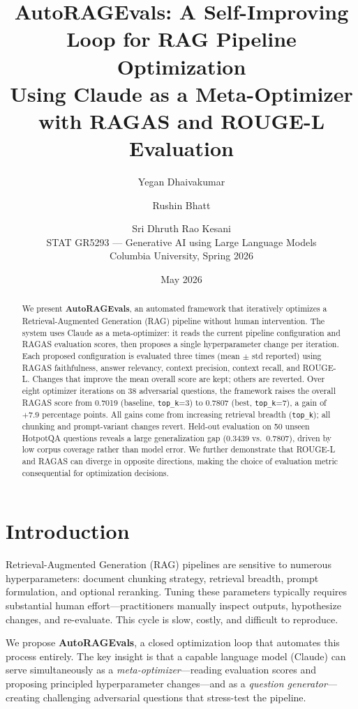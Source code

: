 \documentclass[11pt,a4paper]{article}
\title{%
  \textbf{AutoRAGEvals: A Self-Improving Loop for RAG Pipeline Optimization}\\[0.5em]
  \large Using Claude as a Meta-Optimizer with RAGAS and ROUGE-L Evaluation
}
\author{%
  Yegan Dhaivakumar \and Rushin Bhatt \and Sri Dhruth Rao Kesani\\[0.4em]
  \small STAT GR5293 --- Generative AI using Large Language Models\\
  \small Columbia University, Spring 2026
}
\date{May 2026}
\begin{document}
\maketitle

\begin{abstract}
We present \textbf{AutoRAGEvals}, an automated framework that iteratively
optimizes a Retrieval-Augmented Generation (RAG) pipeline without human
intervention. The system uses Claude as a meta-optimizer: it reads the current
pipeline configuration and RAGAS evaluation scores, then proposes a single
hyperparameter change per iteration. Each proposed configuration is evaluated
three times (mean $\pm$ std reported) using RAGAS faithfulness, answer
relevancy, context precision, context recall, and ROUGE-L. Changes that improve
the mean overall score are kept; others are reverted. Over eight optimizer
iterations on 38 adversarial questions, the framework raises the overall RAGAS
score from 0.7019 (baseline, \texttt{top\_k}=3) to 0.7807 (best, \texttt{top\_k}=7),
a gain of $+7.9$ percentage points. All gains come from increasing retrieval
breadth (\texttt{top\_k}); all chunking and prompt-variant changes revert.
Held-out evaluation on 50 unseen HotpotQA questions reveals a large
generalization gap (0.3439 vs.\ 0.7807), driven by low corpus coverage rather
than model error. We further demonstrate that ROUGE-L and RAGAS can diverge in
opposite directions, making the choice of evaluation metric consequential for
optimization decisions.
\end{abstract}

\section{Introduction}

Retrieval-Augmented Generation (RAG) pipelines are sensitive to numerous
hyperparameters: document chunking strategy, retrieval breadth, prompt
formulation, and optional reranking. Tuning these parameters typically requires
substantial human effort---practitioners manually inspect outputs, hypothesize
changes, and re-evaluate. This cycle is slow, costly, and difficult to
reproduce.

We propose \textbf{AutoRAGEvals}, a closed optimization loop that automates
this process entirely. The key insight is that a capable language model
(Claude) can serve simultaneously as a \emph{meta-optimizer}---reading
evaluation scores and proposing principled hyperparameter changes---and as a
\emph{question generator}---creating challenging adversarial questions that
stress-test the pipeline.
\end{document}
